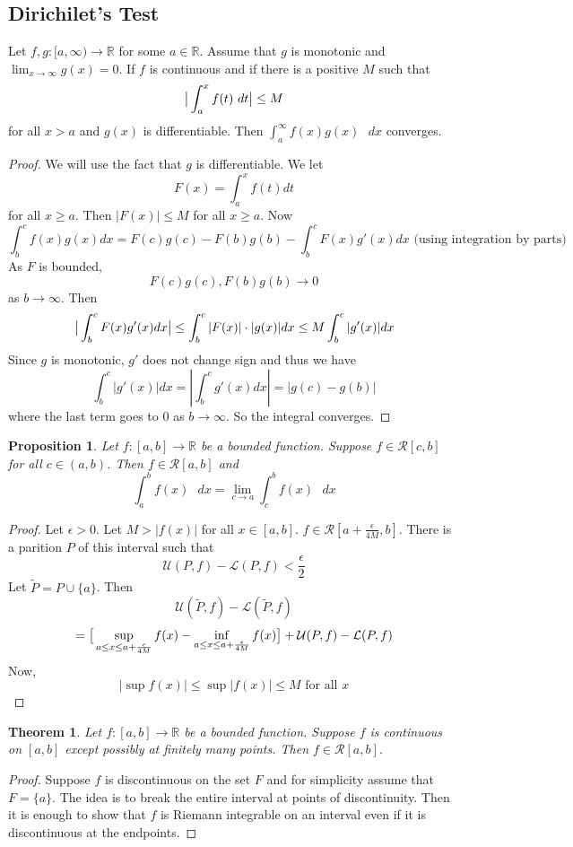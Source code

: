 \documentclass{article}
\newtheorem{theorem}{Theorem}
\newtheorem{proposition}{Proposition}
\begin{document}
\subsection*{Dirichilet's Test}
Let $f,g:[a,\infty)\to\mathbb{R}$ for some $a\in\mathbb{R}$. Assume that $g$ is monotonic and $\lim_{x\to\infty}g(x)=0$. If $f$ is continuous and if there is a positive $M$ such that 
$$\big{|}\int_a^x f(t)\text{ }dt\big{|}\leq M$$ for all $x>a$ and $g(x)$ is differentiable. Then $\int_a^{\infty} f(x)g(x)\text{ }dx$ converges.
\begin{proof}
    We will use the fact that $g$ is differentiable. We let 
    $$F(x)=\int_a^xf(t)dt$$ for all $x\geq a$. Then $|F(x)|\leq M$ for all $x\geq a$. Now
    $$\int_b^c f(x)g(x)dx=F(c)g(c)-F(b)g(b)-\int_b^c F(x)g'(x)dx\text{ (using integration by parts)}$$
As $F$ is bounded, 
$$F(c)g(c),F(b)g(b)\to 0$$ as $b\to\infty$. Then 
$$\big{|}\int_b^c F(x)g'(x)dx\big{|}\leq \int_b^c |F(x)|\cdot|g(x)|dx\leq M\int_b^c |g'(x)|dx $$
Since $g$ is monotonic, $g'$ does not change sign and thus we have 
$$\int_b^c |g'(x)|dx=|\int_b^c g'(x)dx|=|g(c)-g(b)|$$
where the last term goes to 0 as $b\to \infty$.
So the integral converges. 
\end{proof}
\begin{proposition}
    Let $f:[a,b]\to\mathbb{R}$ be a bounded function. Suppose $f\in\mathcal{R}[c,b]$ for all $c\in(a,b)$. Then $f\in\mathcal{R}[a,b]$ and $$\int_a^b f(x)\text{ }dx=\lim_{c\to a}\int_c^b f(x)\text{ }dx$$
\end{proposition}
\begin{proof}
    Let $\epsilon>0$. Let $M>|f(x)|$ for all $x\in[a,b]$. $f\in\mathcal{R}[a+\frac{\epsilon}{4M},b]$. There is a parition $P$ of this interval such that
    $$\mathcal{U}(P,f)-\mathcal{L}(P,f)<\frac{\epsilon}{2}$$
    Let $\tilde{P}=P\cup\{a\}$. Then 
    $$\mathcal{U}(\tilde{P},f)-\mathcal{L}(\tilde{P},f)$$
    $$=\big{[}\sup_{a\leq x\leq a+\frac{\epsilon}{4M}}f(x)-\inf_{a\leq x\leq a+\frac{\epsilon}{4M}}f(x)\big{]}+\mathcal{U}(P,f)-\mathcal{L}(P,f)$$
Now,
$$|\sup f(x)|\leq \sup |f(x)|\leq M\text{ for all }x$$
\end{proof}
\begin{theorem}
    Let $f:[a,b]\to\mathbb{R}$ be a bounded function. Suppose $f$ is continuous on $[a,b]$ except possibly at finitely many points. Then $f\in\mathcal{R}[a,b]$.
\end{theorem}
\begin{proof}
    Suppose $f$ is discontinuous on the set $F$ and for simplicity assume that $F=\{a\}$. The idea is to break the entire interval at points of discontinuity. Then it is enough to show that $f$ is Riemann integrable on an interval even if it is discontinuous at the endpoints.   
\end{proof}
\end{document}
